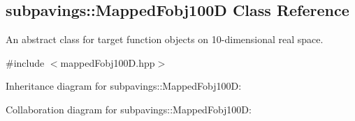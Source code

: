 \hypertarget{classsubpavings_1_1MappedFobj100D}{\subsection{subpavings\-:\-:\-Mapped\-Fobj100\-D \-Class \-Reference}
\label{classsubpavings_1_1MappedFobj100D}
}


\-An abstract class for target function objects on 10-\/dimensional real space.  




{\ttfamily \#include $<$mapped\-Fobj100\-D.\-hpp$>$}



\-Inheritance diagram for subpavings\-:\-:\-Mapped\-Fobj100\-D\-:


\-Collaboration diagram for subpavings\-:\-:\-Mapped\-Fobj100\-D\-:
